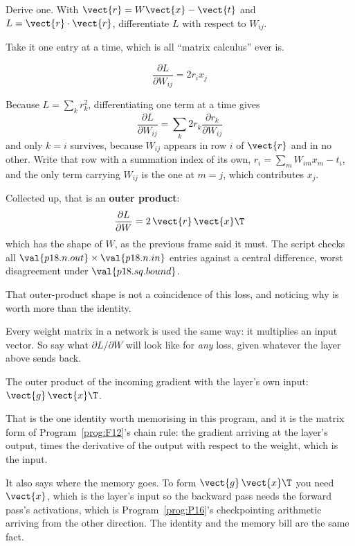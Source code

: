 \begin{fr}
Derive one. With $\vect{r} = W\vect{x} - \vect{t}$ and
$L = \vect{r} \cdot \vect{r}$, differentiate $L$ with respect to $W_{ij}$.

Take it one entry at a time, which is all \enquote{matrix calculus} ever is.
\dotline
\nextframe
\end{fr}

\begin{fr}
\begin{ansblock}
\[ \frac{\partial L}{\partial W_{ij}} = 2 r_i x_j \]
\end{ansblock}

Because $L = \sum_k r_k^{2}$, differentiating one term at a time gives
\[ \frac{\partial L}{\partial W_{ij}} = \sum_k 2 r_k
   \frac{\partial r_k}{\partial W_{ij}} \]
and only $k = i$ survives, because $W_{ij}$ appears in row $i$ of $\vect{r}$
and in no other. Write that row with a summation index of its own,
$r_i = \sum_m W_{im}x_m - t_i$, and the only term carrying $W_{ij}$ is the
one at $m = j$, which contributes $x_j$.

Collected up, that is an \textbf{outer product}:
\[ \frac{\partial L}{\partial W} = 2\,\vect{r}\,\vect{x}\T \]
which has the shape of $W$, as the previous frame said it must. The script
checks all $\val{p18.n.out}\times\val{p18.n.in}$ entries against a central
difference, worst disagreement under $\val{p18.sq.bound}$.
\end{fr}

\begin{fr}
That outer-product shape is not a coincidence of this loss, and noticing why
is worth more than the identity.

Every weight matrix in a network is used the same way: it multiplies an input
vector. So say what $\partial L/\partial W$ will look like for \emph{any}
loss, given whatever the layer above sends back.
\dotline
\nextframe
\end{fr}

\begin{fr}
\begin{ansblock}
The outer product of the incoming gradient with the layer's own input:
$\vect{g}\,\vect{x}\T$.
\end{ansblock}

That is the one identity worth memorising in this program, and it is the
matrix form of Program~\ref{prog:F12}'s chain rule: the gradient arriving at
the layer's output, times the derivative of the output with respect to the
weight, which is the input.

\begin{note}
It also says where the memory goes. To form $\vect{g}\,\vect{x}\T$ you need
$\vect{x}$, which is the layer's input \dash{} so the backward pass needs the
forward pass's activations, which is Program~\ref{prog:P16}'s checkpointing
arithmetic arriving from the other direction. The identity and the memory
bill are the same fact.
\end{note}
\end{fr}

